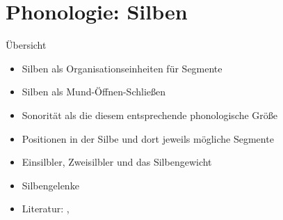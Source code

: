 
\section{Phonologie: Silben}

\begin{frame}
  {Übersicht}
  \pause
  \begin{itemize}[<+->]
    \item Silben als Organisationseinheiten für Segmente
    \item Silben als Mund-Öffnen-Schließen
    \item \alert{Sonorität} als die diesem entsprechende phonologische Größe
    \item Positionen in der Silbe und dort jeweils mögliche Segmente
    \item Einsilbler, Zweisilbler und das \alert{Silbengewicht}
    \item \alert{Silbengelenke}
      \Zeile
    \item Literatur: , \citet{Maas2002}
  \end{itemize}
\end{frame}


